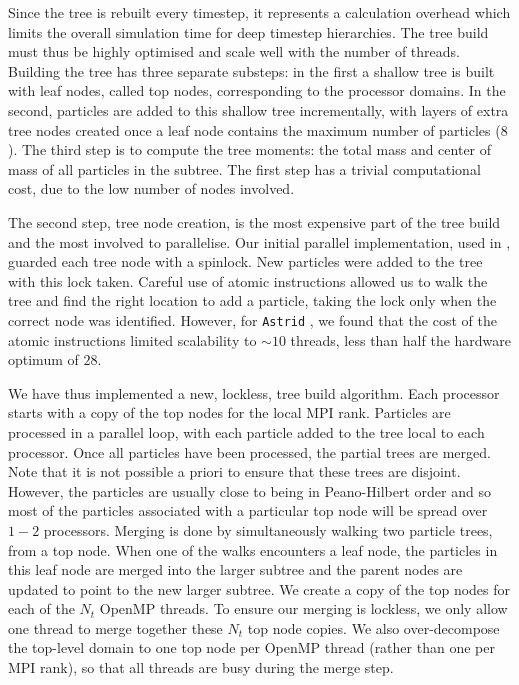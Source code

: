 \documentclass[fleqn,usenatbib]{mnras}
\def\astrid{\texttt{Astrid} }
\begin{document}
Since the tree is rebuilt every timestep, it represents a calculation overhead which limits the overall simulation time for deep timestep hierarchies. The tree build must thus be highly optimised and scale well with the number of threads. Building the tree has three separate substeps: in the first a shallow tree is built with leaf nodes, called top nodes, corresponding to the processor domains. In the second, particles are added to this shallow tree incrementally, with layers of extra tree nodes created once a leaf node contains the maximum number of particles ($8$). The third step is to compute the tree moments: the total mass and center of mass of all particles in the subtree. The first step has a trivial computational cost, due to the low number of nodes involved.

The second step, tree node creation, is the most expensive part of the tree build and the most involved to parallelise. Our initial parallel implementation, used in \cite{Bird:2018}, guarded each tree node with a spinlock. New particles were added to the tree with this lock taken. Careful use of atomic instructions allowed us to walk the tree and find the right location to add a particle, taking the lock only when the correct node was identified. However, for \astrid, we found that the cost of the atomic instructions limited scalability to $\sim 10$ threads, less than half the hardware optimum of $28$.

We have thus implemented a new, lockless, tree build algorithm. Each processor starts with a copy of the top nodes for the local MPI rank. Particles are processed in a parallel loop, with each particle added to the tree local to each processor. Once all particles have been processed, the partial trees are merged. Note that it is not possible a priori to ensure that these trees are disjoint. However, the particles are usually close to being in Peano-Hilbert order and so most of the particles associated with a particular top node will be spread over $1-2$ processors. Merging is done by simultaneously walking two particle trees, from a top node. When one of the walks encounters a leaf node, the particles in this leaf node are merged into the larger subtree and the parent nodes are updated to point to the new larger subtree. We create a copy of the top nodes for each of the $N_t$ OpenMP threads. To ensure our merging is lockless, we only allow one thread to merge together these $N_t$ top node copies. We also over-decompose the top-level domain to one top node per OpenMP thread (rather than one per MPI rank), so that all threads are busy during the merge step.
\end{document}
